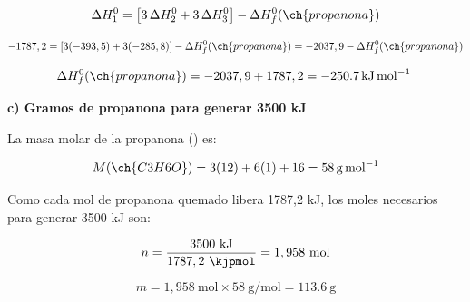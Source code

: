 \begin{exerciseEVAU}
\begin{solu}
        \begin{equation*}
            \Delta H^0_1 = \left[ 3\, \Delta H^0_2 + 3\, \Delta H^0_3 \right] - \Delta H^0_f (\ch{propanona})
        \end{equation*}

        \begin{equation*}
            -1787,2 = \left[ 3(-393,5) + 3(-285,8) \right] - \Delta H^0_f (\ch{propanona}) = -2037,9 - \Delta H^0_f (\ch{propanona})
        \end{equation*}

        \begin{equation*}
            \Delta H^0_f (\ch{propanona}) = -2037,9 + 1787,2 = \energia[kjmol]{-250.7}
        \end{equation*}

        \textbf{c) Gramos de propanona para generar 3500 kJ}

        La masa molar de la propanona () es:

        \begin{equation*}
            M(\ch{C3H6O}) = 3(12) + 6(1) + 16 = \SI{58}{\gram\per\mole}
        \end{equation*}

        Como cada mol de propanona quemado libera 1787,2 kJ, los moles necesarios para generar 3500 kJ son:

        \begin{equation*}
            n = \dfrac{3500 \ \si{\kilo\joule}}{1787,2 \ \si{\kjpmol}} = 1,958 \ \text{mol}
        \end{equation*}

        \begin{equation*}
            m = 1,958 \ \text{mol} \times 58 \ \si{\gram\per\mole} = \SI{113.6}{\gram}
        \end{equation*}

    \end{solu}
\end{exerciseEVAU}


